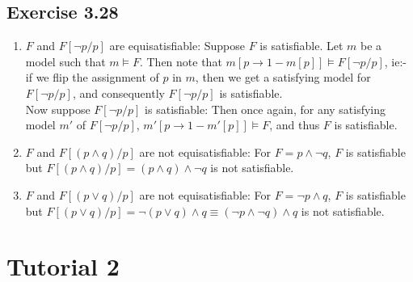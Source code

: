 \documentclass{article}
\begin{document}
\subsection*{Exercise 3.28}
\begin{enumerate}[label=(\alph*)]
    \item $F$ and $F[\lnot p/p]$ are equisatisfiable: Suppose $F$ is satisfiable. Let $m$ be a model such that $m\models F$. Then note that $m[p\rightarrow 1-m[p]]\models F[\lnot p/p]$, ie:- if we flip the assignment of $p$ in $m$, then we get a satisfying model for $F[\lnot p/p]$, and consequently $F[\lnot p/p]$ is satisfiable.\\
    Now suppose $F[\lnot p/p]$ is satisfiable: Then once again, for any satisfying model $m'$ of $F[\lnot p/p]$, $m'[p\rightarrow 1-m'[p]]\models F$, and thus $F$ is satisfiable.
    \item $F$ and $F[(p\wedge q)/p]$ are not equisatisfiable: For $F = p\wedge\lnot q$, $F$ is satisfiable but $F[(p\wedge q)/p] = (p\wedge q)\wedge\lnot q$ is not satisfiable.
    \item $F$ and $F[(p\lor q)/p]$ are not equisatisfiable: For $F = \lnot p\wedge q$, $F$ is satisfiable but $F[(p\lor q)/p] = \lnot(p\lor q)\wedge q\equiv (\lnot p\wedge\lnot q)\wedge q$ is not satisfiable.
\end{enumerate}
\section{Tutorial 2}
\end{document}
